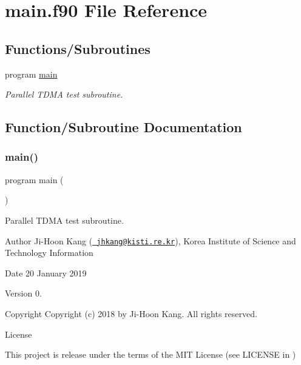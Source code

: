 \hypertarget{main_8f90}{}\section{main.\+f90 File Reference}
\label{main_8f90}
\subsection*{Functions/\+Subroutines}
\begin{DoxyCompactItemize}
\item 
program \mbox{\hyperlink{main_8f90_a8ec2266d83cd6c0b762cbcbc92c0af3d}{main}}
\begin{DoxyCompactList}\small\item\em Parallel T\+D\+MA test subroutine. \end{DoxyCompactList}\end{DoxyCompactItemize}


\subsection{Function/\+Subroutine Documentation}
\mbox{\label{main_8f90_a8ec2266d83cd6c0b762cbcbc92c0af3d}} 
\subsubsection{\texorpdfstring{main()}{main()}}
{\footnotesize\ttfamily program main (\begin{DoxyParamCaption}{ }\end{DoxyParamCaption})}



Parallel T\+D\+MA test subroutine. 

\begin{DoxyAuthor}{Author}
Ji-\/\+Hoon Kang (\href{mailto:jhkang@kisti.re.kr}{\texttt{ jhkang@kisti.\+re.\+kr}}), Korea Institute of Science and Technology Information 
\end{DoxyAuthor}
\begin{DoxyDate}{Date}
20 January 2019 
\end{DoxyDate}
\begin{DoxyVersion}{Version}
0. 
\end{DoxyVersion}
\begin{DoxyParagraph}{Copyright}
Copyright (c) 2018 by Ji-\/\+Hoon Kang. All rights reserved. 
\end{DoxyParagraph}
\begin{DoxyParagraph}{License }

\end{DoxyParagraph}
This project is release under the terms of the M\+IT License (see L\+I\+C\+E\+N\+SE in ) 